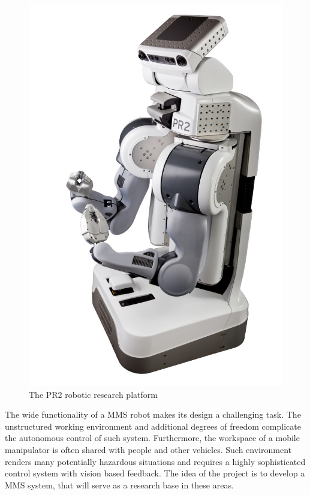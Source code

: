\begin{figure}[H]
\centering
\includegraphics[totalheight=0.3\textheight]{fig/pr2}
\caption{The PR2 robotic research platform \cite{prspecs}}
\label{fig:pr2}
\end{figure}

The wide functionality of a MMS robot makes its design a challenging task. The unstructured working environment and additional degrees of freedom complicate the autonomous control of such system. Furthermore, the workspace of a mobile manipulator is often shared with people and other vehicles. Such environment renders many potentially hazardous situations and requires a highly sophisticated control system with vision based feedback. The idea of the project is to develop a MMS system, that will serve as a research base in these areas.

